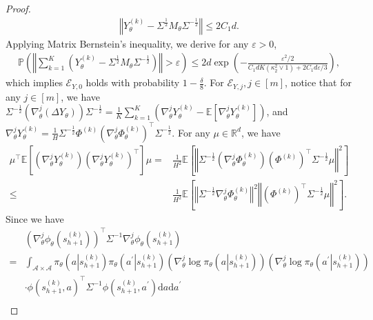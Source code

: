 \documentclass{article}
\numberwithin{equation}{section}
\begin{document}
\begin{proof}
\begin{align*}
    \left\Vert Y_\theta^{(k)}-\Sigma^{\frac{1}{2}}M_\theta\Sigma^{-\frac{1}{2}}\right\Vert\leq 2C_1d. 
\end{align*}
Applying Matrix Bernstein's inequality, we derive for any $\varepsilon>0$,
\begin{align*}
    \mathbb{P}\left(\left\Vert\sum_{k=1}^K\left(Y_\theta^{(k)}-\Sigma^{\frac{1}{2}}M_\theta\Sigma^{-\frac{1}{2}}\right)\right\Vert>\varepsilon\right)\leq 2d\exp\left(-\frac{\varepsilon^2/2}{C_1dK\left(\kappa_2^2\vee 1\right)+2C_1d\varepsilon/3}\right), 
\end{align*}
which implies $\mathcal{E}_{Y,0}$ holds with probability $1-\frac{\delta}{8}$. For $\mathcal{E}_{Y,j},j\in[m]$, notice that for any $j\in[m]$, we have $\Sigma^{-\frac{1}{2}}(\nabla_\theta^j(\Delta Y_\theta))\Sigma^{-\frac{1}{2}}=\frac{1}{K}\sum_{k=1}^K\left(\nabla_\theta^j Y_\theta^{(k)}-\mathbb{E}\left[\nabla_\theta^j Y_\theta^{(k)}\right]\right)$, and $\nabla_\theta^j Y_\theta^{(k)}=\frac{1}{H}\Sigma^{-\frac{1}{2}}\Phi^{(k)}\left(\nabla_\theta^j\Phi_\theta^{(k)}\right)^\top\Sigma^{-\frac{1}{2}}$. For any $\mu\in\mathbb{R}^d$, we have
\begin{align*}
    \mu^\top\mathbb{E}\left[\left(\nabla_\theta^j Y_\theta^{(k)}\right)\left(\nabla_\theta^j Y_\theta^{(k)}\right)^\top\right]\mu=&\frac{1}{H^2}\mathbb{E}\left[\left\Vert\Sigma^{-\frac{1}{2}}\left(\nabla_\theta^j\Phi_\theta^{(k)}\right)\left(\Phi^{(k)}\right)^\top\Sigma^{-\frac{1}{2}}\mu\right\Vert^2\right]\\
    \leq&\frac{1}{H^2}\mathbb{E}\left[\left\Vert\Sigma^{-\frac{1}{2}}\nabla_\theta^j\Phi_\theta^{(k)}\right\Vert^2\left\Vert\left(\Phi^{(k)}\right)^\top\Sigma^{-\frac{1}{2}}\mu\right\Vert^2\right]. 
\end{align*}
Since we have 
\begin{align*}
    &\left(\nabla_\theta^j\phi_\theta\left(s_{h+1}^{(k)}\right)\right)^\top\Sigma^{-1}\nabla_\theta^j\phi_\theta\left(s_{h+1}^{(k)}\right)\\
    =&\int_{\mathcal{A}\times\mathcal{A}}\pi_\theta\left(a\left\vert s_{h+1}^{(k)}\right.\right)\pi_\theta\left(a^\prime\left\vert s_{h+1}^{(k)}\right.\right)\left(\nabla_\theta^j\log\pi_\theta\left(a\left\vert s_{h+1}^{(k)}\right.\right)\right)\left(\nabla_\theta^j\log\pi_\theta\left(a^\prime\left\vert s_{h+1}^{(k)}\right.\right)\right)\\
    &\cdot\phi\left(s_{h+1}^{(k)},a\right)^\top\Sigma^{-1}\phi\left(s_{h+1}^{(k)},a^\prime\right)\mathrm{d}a\mathrm{d}a^\prime\\

\end{align*}
\end{proof}
\end{document}
